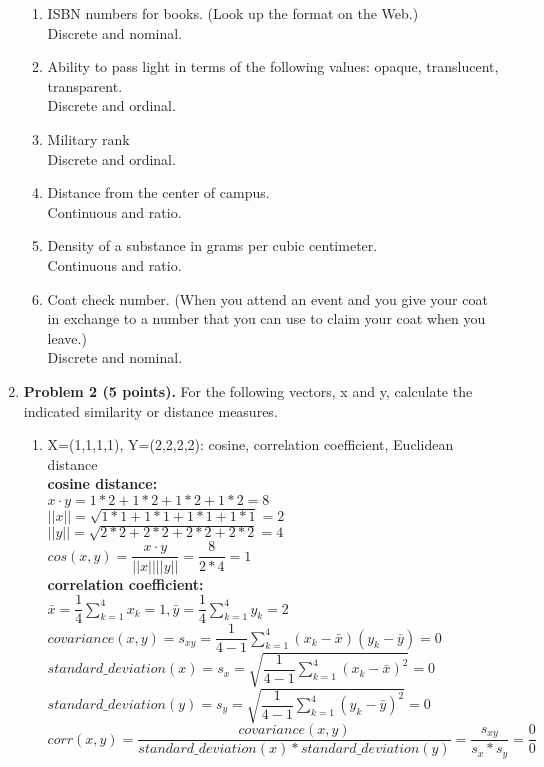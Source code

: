\documentclass{article}%
\begin{document}
\begin{enumerate}
\begin{enumerate}
		\item ISBN numbers for books. (Look up the format on the Web.) \\
		Discrete and nominal.		
		
		\item Ability to pass light in terms of the following values: opaque, translucent, transparent. \\
		Discrete and ordinal.
		
		\item Military rank\\
		Discrete and ordinal.		
		
		\item Distance from the center of campus. \\
		Continuous and ratio.	
		
		\item Density of a substance in grams per cubic centimeter. \\
		Continuous and ratio.
		
		\item Coat check number. (When you attend an event and you give your coat in exchange to a number that you can use to claim your coat when you leave.) \\
		Discrete and nominal.
	\end{enumerate}
  
 \item \textbf{Problem 2 (5 points).} For the following vectors, x and y, calculate the indicated similarity or distance measures.
 \begin{enumerate}
		\item X=(1,1,1,1), Y=(2,2,2,2): cosine, correlation coefficient, Euclidean distance \\
		\textbf{cosine distance:} \\
		$ x \cdot  y = 1*2 + 1*2 + 1*2 + 1*2  = 8$ \\
		$ ||x|| = \sqrt{1*1 + 1*1 + 1*1 + 1*1} = 2 $ \\
		$ ||y|| = \sqrt{2*2 + 2*2 + 2*2 + 2*2} = 4 $ \\
		$ cos(x,y) = \dfrac{x \cdot y }{ ||x|| ||y||} = \dfrac{8}{2*4} = 1 $\\
		
		\textbf{correlation coefficient: }\\
		$ \bar{x} = \dfrac{1}{4} \sum_{k=1}^4x_k=1, \bar{y} = \dfrac{1}{4} \sum_{k=1}^4y_k = 2 $ \\
		$ covariance(x,y) = s_{xy} = \dfrac{1}{4 - 1} \sum_{k=1}^{4}(x_k - \bar{x})(y_k-\bar{y}) = 0$	\\
		$ standard\_deviation(x) = s_{x} = \sqrt{\dfrac{1}{4-1}\sum_{k=1}^{4}(x_k - \bar{x})^2} = 0$	\\		
		$ standard\_deviation(y) = s_{y} = \sqrt{\dfrac{1}{4-1}\sum_{k=1}^{4}(y_k - \bar{y})^2} = 0$	\\		
		$ corr(x,y) = \dfrac{covariance(x,y)}{standard\_deviation(x)*standard\_deviation(y)} = \dfrac{s_{xy}}{s_x*s_y} = \dfrac{0}{0}$	 \\
		

\end{enumerate}
\end{enumerate}
\end{document}
